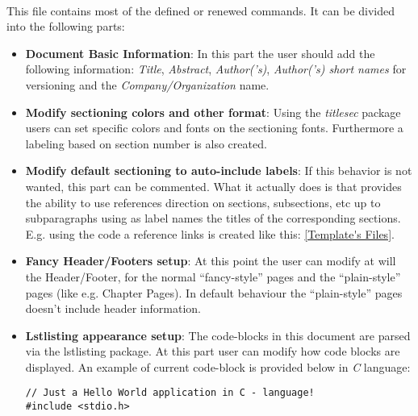 \begin{description}
\item{\textbf{}} \hfill \\
This file contains most of the defined or renewed commands. It can be divided into the following parts:
\begin{itemize}
\item{\textbf{Document Basic Information}}: In this part the user should add the following information: \textit{Title}, \textit{Abstract}, \textit{Author('s)}, \textit{Author('s) short names} for versioning and the \textit{Company/Organization} name.
\item{\textbf{Modify sectioning colors and other format}}: Using the \textit{titlesec} package users can set specific colors and fonts on the sectioning fonts. Furthermore a labeling based on section number is also created.
\item{\textbf{Modify default sectioning to auto-include labels}}: If this behavior is not wanted, this part can be commented. What it actually does is that provides the ability to use references direction on sections, subsections, etc up to subparagraphs using as label names the titles of the corresponding sections. E.g. using the  code a reference links is created like this: \ref{Template's Files}.
\item{\textbf{Fancy Header/Footers setup}}: At this point the user can modify at will the Header/Footer, for the normal ``fancy-style'' pages and the ``plain-style'' pages (like e.g. Chapter Pages). In default behaviour the ``plain-style'' pages doesn't include header information.
\item{\textbf{Lstlisting appearance setup}}: The code-blocks in this document are parsed via the lstlisting package. At this part user can modify how code blocks are displayed. An example of current code-block is provided below in \textit{C} language:
\lstset{language=c}
\begin{lstlisting}
// Just a Hello World application in C - language!
#include <stdio.h>


\end{lstlisting}
\end{itemize}
\end{description}
